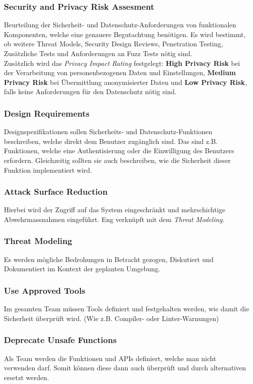\subsubsection{Security and Privacy Risk Assesment}
Beurteilung der Sicherheit- und Datenschutz-Anforderungen von funktionalen Komponenten, welche eine genauere Begutachtung benötigen. Es wird bestimmt, ob weitere Threat Models, Security Design Reviews, Penetration Testing, Zusätzliche Tests und Anforderungen an Fuzz Tests nötig sind.\\
Zusätzlich wird das \textit{Privacy Impact Rating} festgelegt: \textbf{High Privacy Risk} bei der Verarbeitung von personenbezogenen Daten und Einstellungen, \textbf{Medium Privacy Risk} bei Übermittlung anonymisierter Daten und \textbf{Low Privacy Risk}, falls keine Anforderungen für den Datenschutz nötig sind.


\subsubsection{Design Requirements}
Designspezifikationen sollen Sicherheits- und Datenschutz-Funktionen beschreiben, welche direkt dem Benutzer zugänglich sind. Das sind z.B. Funktionen, welche eine Authentisierung oder die Einwilligung des Benutzers erfordern. Gleichzeitig sollten sie auch beschreiben, wie die Sicherheit dieser Funktion implementiert wird.

\subsubsection{Attack Surface Reduction}
Hierbei wird der Zugriff auf das System eingeschränkt und mehrschichtige Abwehrmassnahmen eingeführt. Eng verknüpft mit dem \textit{Threat Modeling}.

\subsubsection{Threat Modeling}
Es werden mögliche Bedrohungen in Betracht gezogen, Diskutiert und Dokumentiert im Kontext der geplanten Umgebung.

\subsubsection{Use Approved Tools}
Im gesamten Team müssen Tools definiert und festgehalten werden, wie damit die Sicherheit überprüft wird. (Wie z.B. Compiler- oder Linter-Warnungen)

\subsubsection{Deprecate Unsafe Functions}
Als Team werden die Funktionen und APIs definiert, welche man nicht verwenden darf. Somit können diese dann auch überprüft und durch alternativen ersetzt werden.

